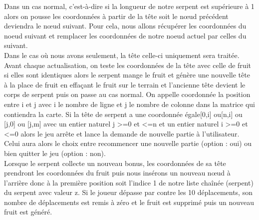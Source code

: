\documentclass{article}
\begin{document}
Dans un cas normal, c’est-à-dire si la longueur de notre serpent est supérieure à 1 alors on pousse les coordonnées à partir de la tête soit le nœud précédent deviendra le nœud suivant. Pour cela, nous allons récupérer les coordonnées du noeud suivant et remplacer les coordonnées de notre noeud actuel par celles du suivant.\\[0.5cm]
Dans le cas où nous avons seulement, la tête celle-ci uniquement sera traitée. Avant chaque actualisation, on  teste les coordonnées de la tête avec celle de fruit si elles sont identiques alors le serpent mange le fruit et génère une nouvelle tête à la place de fruit en effaçant le fruit sur le terrain et l’ancienne tête devient le corps de serpent puis on passe au cas normal. On appelle coordonnée la position entre i et j avec i le nombre de ligne et j le nombre de colonne dans la matrice qui contiendra la carte. Si la tête de serpent a une coordonnée égale[0,i] ou[n,i] ou [j,0] ou [j,m] avec un entier naturel j  >=0 et <=n et un entier naturel i >=0 et <=0  alors le jeu arrête et lance la demande de nouvelle partie à l’utilisateur. Celui aura alors le choix entre recommencer une nouvelle partie (option : oui) ou bien quitter le jeu (option : non).\\[0.5cm]
Lorsque le serpent collecte un nouveau bonus, les coordonnées de sa tête prendront les coordonnées du fruit puis nous insérons un nouveau nœud à l’arrière donc à la première position soit l’indice 1 de notre liste chaînée (serpent) du serpent avec valeur z. Si le joueur dépasse par contre les 10 déplacements, son nombre de déplacements est remis à zéro et le fruit est supprimé puis un nouveau fruit est généré.\\[0.5cm]
\end{document}
